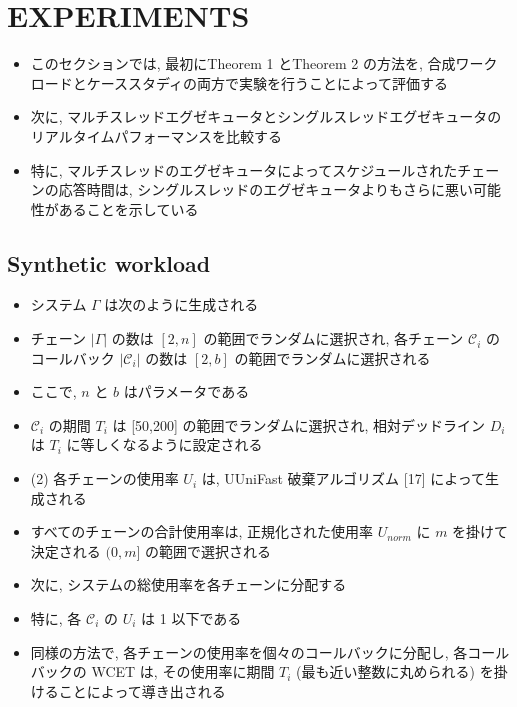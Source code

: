 
\section{EXPERIMENTS}
\label{sec: experiments}


\begin{frame}{}
    \begin{itemize}
        \item このセクションでは, 最初にTheorem 1 とTheorem 2 の方法を, 合成ワークロードとケーススタディの両方で実験を行うことによって評価する
\item 次に, マルチスレッドエグゼキュータとシングルスレッドエグゼキュータのリアルタイムパフォーマンスを比較する
\item 特に, マルチスレッドのエグゼキュータによってスケジュールされたチェーンの応答時間は, シングルスレッドのエグゼキュータよりもさらに悪い可能性があることを示している
    \end{itemize}
\end{frame}


\subsection{Synthetic workload}
\label{ssec: synthetic workload}

\begin{frame}{}
    \begin{itemize}
        \item システム $\Gamma$ は次のように生成される
\item チェーン $|\Gamma|$ の数は $[2, n]$ の範囲でランダムに選択され, 各チェーン $\mathcal{C}_{i}$ のコールバック $\left|\mathcal{C}_{i}\right|$ の数は $[2, b]$ の範囲でランダムに選択される
\item ここで, $n$ と $b$ はパラメータである
\item $\mathcal{C}_{i}$ の期間 $T_{i}$ は [50,200] の範囲でランダムに選択され, 相対デッドライン $D_{i}$ は $T_{i}$ に等しくなるように設定される
\item (2) 各チェーンの使用率 $U_{i}$ は, UUniFast 破棄アルゴリズム [17] によって生成される
\item すべてのチェーンの合計使用率は, 正規化された使用率 $U_{n o r m}$ に $m$ を掛けて決定される $(0, m]$ の範囲で選択される
\item 次に, システムの総使用率を各チェーンに分配する
\item 特に, 各 $\mathcal{C}_{i}$ の $U_{i}$ は 1 以下である
\item 同様の方法で, 各チェーンの使用率を個々のコールバックに分配し, 各コールバックの WCET は, その使用率に期間 $T_{i}$ (最も近い整数に丸められる) を掛けることによって導き出される
    \end{itemize}
\end{frame}


